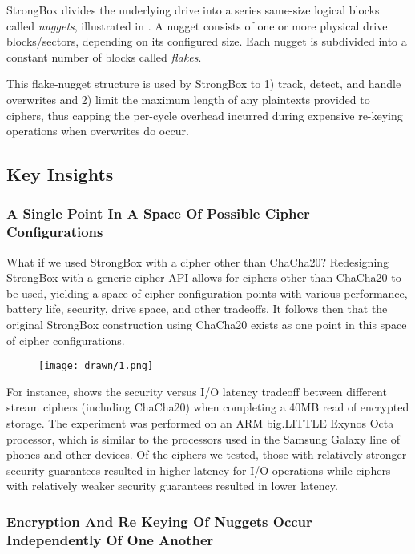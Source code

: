 StrongBox divides the underlying drive into a series same-size logical blocks
called \emph{nuggets}, illustrated in . A nugget consists of one
or more physical drive blocks/sectors, depending on its configured size. Each
nugget is subdivided into a constant number of blocks called \emph{flakes}.

This flake-nugget structure is used by StrongBox to 1) track, detect, and handle
overwrites and 2) limit the maximum length of any plaintexts provided to
ciphers, thus capping the per-cycle overhead incurred during expensive re-keying
operations when overwrites do occur.

\subsection{Key Insights}

\subsubsection{A Single Point In A Space Of Possible Cipher Configurations}

What if we used StrongBox with a cipher other than ChaCha20? Redesigning
StrongBox with a generic cipher API allows for ciphers other than ChaCha20 to be
used, yielding a space of cipher configuration points with various performance,
battery life, security, drive space, and other tradeoffs. It follows then that
the original StrongBox construction using ChaCha20 exists as one point in this
space of cipher configurations.

\begin{figure}[ht]
   \centering
   \texttt{[image: drawn/1.png]}
   \caption{}\label{fig:40mb-read}
\end{figure}

For instance,  shows the security versus I/O latency tradeoff
between different stream ciphers (including ChaCha20) when completing a 40MB
read of encrypted storage. The experiment was performed on an ARM big.LITTLE
Exynos Octa processor, which is similar to the processors used in the Samsung
Galaxy line of phones and other devices. Of the ciphers we tested, those with
relatively stronger security guarantees resulted in higher latency for I/O
operations while ciphers with relatively weaker security guarantees resulted in
lower latency.

\subsubsection{Encryption And Re Keying Of Nuggets Occur Independently Of One
Another}

